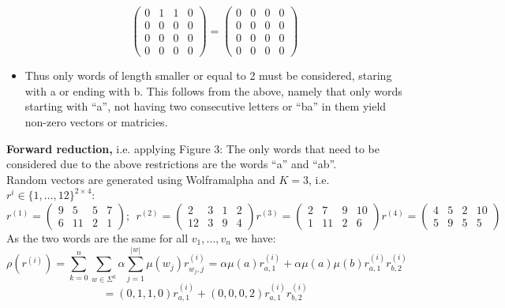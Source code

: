\begin{itemize}
\[\begin{pmatrix}
                                        0 & 1 & 1 & 0 \\
                                        0 & 0 & 0 & 0 \\
                                        0 & 0 & 0 & 0 \\
                                        0 & 0 & 0 & 0
                                    \end{pmatrix} =  \begin{pmatrix}
                                        0 & 0 & 0 & 0 \\
                                        0 & 0 & 0 & 0 \\
                                        0 & 0 & 0 & 0 \\
                                        0 & 0 & 0 & 0
                                    \end{pmatrix} \]
                \item Thus only words of length smaller or equal to 2 must be considered, staring with a or ending with b. This follows from the above, namely that only words starting with ``a'', not having two consecutive letters or ``ba'' in them yield non-zero vectors or matricies.
            \end{itemize}
            \vspace{1.5cm}

        \textbf{Forward reduction,} i.e. applying \autocite{Kiefer2013OnTC} Figure 3: The only words that need to be considered due to the above restrictions are the words ``a'' and ``ab''.\\
        Random vectors are generated using Wolframalpha and $K=3$, i.e. $r^{i} \in \{1, \dots, 12\}^{2 \times 4}$:
        \[  r^{(1)}= \begin{pmatrix}
                        9 & 5 & 5 & 7 \\
                        6 & 11 & 2 & 1 
                    \end{pmatrix}; \ \
            r^{(2)}= \begin{pmatrix}
                        2 & 3 & 1 & 2 \\
                        12 & 3 & 9 & 4 
                    \end{pmatrix} 
            r^{(3)}= \begin{pmatrix}
                        2 & 7 & 9 & 10 \\
                        1 & 11 & 2 & 6 
                    \end{pmatrix}         
            r^{(4)}= \begin{pmatrix}
                        4 & 5 & 2 & 10 \\
                        5 & 9 & 5 & 5 
                    \end{pmatrix}                     
        \]
        As the two words are the same for all $v_1, \dots, v_n$ we have:
        \[ \rho(r^{(i)}) = \sum_{k=0}^{n} \sum_{w \in \Sigma^k} \alpha \sum_{j=1}^{|w|} \mu(w_j) r^{(i)}_{w_j, j} = \alpha\mu(a) r^{(i)}_{a, 1} + \alpha \mu(a) \mu(b) r^{(i)}_{a, 1} r^{(i)}_{b, 2} \]
        \[= (0,1,1,0) r^{(i)}_{a, 1} + (0,0,0,2) r^{(i)}_{a, 1} r^{(i)}_{b, 2} \]
        
